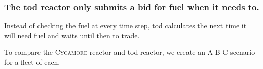 \documentclass[9pt]{beamer}
\newcommand{\cycamore}{\textsc{Cycamore}\xspace}
\newcommand{\cyclus}{\textsc{Cyclus}\xspace}
\begin{document}



\begin{frame}
  \frametitle{The \gls{tod} reactor only submits a bid for fuel when it needs to.}
  Instead of checking the fuel at every time step, \gls{tod} calculates the next time it will need fuel and waits until then to trade. \pause

  \vspace{20pt}
  To compare the \cycamore reactor and \gls{tod} reactor, we create an A-B-C scenario for a fleet of each.
  \begin{center}
  \end{center}
\end{frame}
\end{document}
